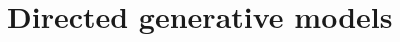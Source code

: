 \documentclass[11pt,mathserif]{beamer}
\begin{document}
% 
% 
%
%




% 

\section{Directed generative models}
\end{document}
